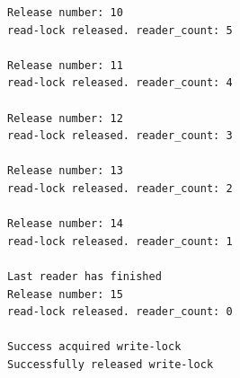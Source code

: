 \documentclass[11pt,a4paper]{article}
\theoremstyle{plain}
\theoremstyle{definition}
\theoremstyle{remark}
\numberwithin{equation}{section}
\begin{document}
\begin{lstlisting}[caption={Test rw\_own.c Prints},label={lst:p2testprint}]
Release number: 10
read-lock released. reader_count: 5

Release number: 11
read-lock released. reader_count: 4

Release number: 12
read-lock released. reader_count: 3

Release number: 13
read-lock released. reader_count: 2

Release number: 14
read-lock released. reader_count: 1

Last reader has finished
Release number: 15
read-lock released. reader_count: 0

Success acquired write-lock
Successfully released write-lock
\end{lstlisting}


%
%
\end{document}
